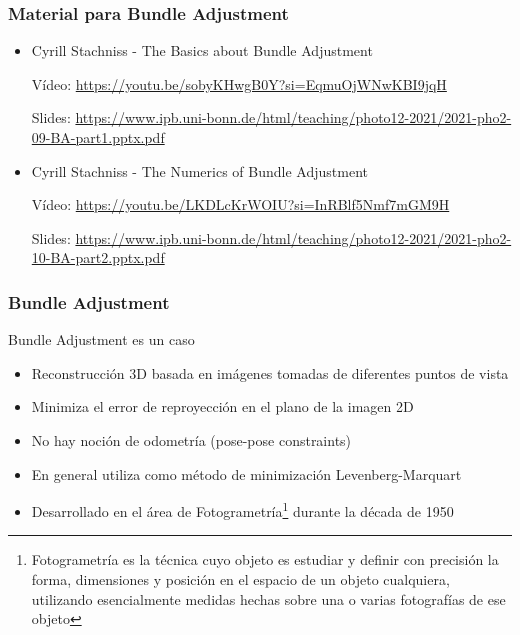 \begin{frame}
    \frametitle{Material para Bundle Adjustment}
    \begin{itemize}
        \item Cyrill Stachniss - The Basics about Bundle Adjustment
        
        Vídeo: \url{https://youtu.be/sobyKHwgB0Y?si=EqmuOjWNwKBI9jqH}
        
        Slides: \url{https://www.ipb.uni-bonn.de/html/teaching/photo12-2021/2021-pho2-09-BA-part1.pptx.pdf}
        \item Cyrill Stachniss - The Numerics of Bundle Adjustment
        
        Vídeo: \url{https://youtu.be/LKDLcKrWOIU?si=InRBlf5Nmf7mGM9H}
        
        Slides: \url{https://www.ipb.uni-bonn.de/html/teaching/photo12-2021/2021-pho2-10-BA-part2.pptx.pdf}
    \end{itemize}
\end{frame}

\begin{frame}
    \frametitle{Bundle Adjustment}
    
    Bundle Adjustment es un caso
    
    \begin{itemize}
        \item Reconstrucción 3D basada en imágenes tomadas de diferentes puntos de vista
        \item Minimiza el error de reproyección en el plano de la imagen 2D
        \item No hay noción de odometría (pose-pose constraints)
        \item En general utiliza como método de minimización Levenberg-Marquart
        \item Desarrollado en el área de Fotogrametría\footnote{Fotogrametría es la técnica cuyo objeto es estudiar y definir con precisión la forma, dimensiones y posición en el espacio de un objeto cualquiera, utilizando esencialmente medidas hechas sobre una o varias fotografías de ese objeto} durante la década de 1950
    \end{itemize}
    
\end{frame}

